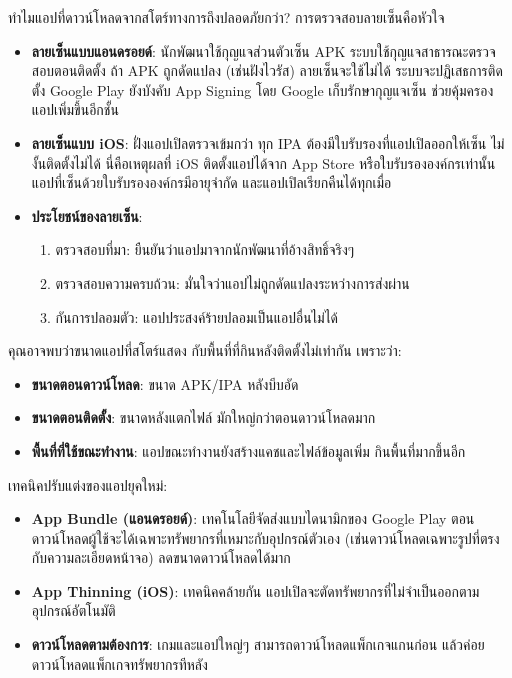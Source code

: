 
ทำไมแอปที่ดาวน์โหลดจากสโตร์ทางการถึงปลอดภัยกว่า? การตรวจสอบลายเซ็นคือหัวใจ

\begin{itemize}
  \item \textbf{ลายเซ็นแบบแอนดรอยด์}: นักพัฒนาใช้กุญแจส่วนตัวเซ็น APK ระบบใช้กุญแจสาธารณะตรวจสอบตอนติดตั้ง ถ้า APK ถูกดัดแปลง (เช่นฝังไวรัส) ลายเซ็นจะใช้ไม่ได้ ระบบจะปฏิเสธการติดตั้ง Google Play ยังบังคับ App Signing โดย Google เก็บรักษากุญแจเซ็น ช่วยคุ้มครองแอปเพิ่มขึ้นอีกชั้น
  \item \textbf{ลายเซ็นแบบ iOS}: ฝั่งแอปเปิลตรวจเข้มกว่า ทุก IPA ต้องมีใบรับรองที่แอปเปิลออกให้เซ็น ไม่งั้นติดตั้งไม่ได้ นี่คือเหตุผลที่ iOS ติดตั้งแอปได้จาก App Store หรือใบรับรององค์กรเท่านั้น แอปที่เซ็นด้วยใบรับรององค์กรมีอายุจำกัด และแอปเปิลเรียกคืนได้ทุกเมื่อ
  \item \textbf{ประโยชน์ของลายเซ็น}:
  \begin{enumerate}
    \item ตรวจสอบที่มา: ยืนยันว่าแอปมาจากนักพัฒนาที่อ้างสิทธิ์จริงๆ
    \item ตรวจสอบความครบถ้วน: มั่นใจว่าแอปไม่ถูกดัดแปลงระหว่างการส่งผ่าน
    \item กันการปลอมตัว: แอปประสงค์ร้ายปลอมเป็นแอปอื่นไม่ได้
  \end{enumerate}
\end{itemize}


คุณอาจพบว่าขนาดแอปที่สโตร์แสดง กับพื้นที่ที่กินหลังติดตั้งไม่เท่ากัน เพราะว่า:

\begin{itemize}
  \item \textbf{ขนาดตอนดาวน์โหลด}: ขนาด APK/IPA หลังบีบอัด
  \item \textbf{ขนาดตอนติดตั้ง}: ขนาดหลังแตกไฟล์ มักใหญ่กว่าตอนดาวน์โหลดมาก
  \item \textbf{พื้นที่ที่ใช้ขณะทำงาน}: แอปขณะทำงานยังสร้างแคชและไฟล์ข้อมูลเพิ่ม กินพื้นที่มากขึ้นอีก
\end{itemize}

เทคนิคปรับแต่งของแอปยุคใหม่:

\begin{itemize}
  \item \textbf{App Bundle (แอนดรอยด์)}: เทคโนโลยีจัดส่งแบบไดนามิกของ Google Play ตอนดาวน์โหลดผู้ใช้จะได้เฉพาะทรัพยากรที่เหมาะกับอุปกรณ์ตัวเอง (เช่นดาวน์โหลดเฉพาะรูปที่ตรงกับความละเอียดหน้าจอ) ลดขนาดดาวน์โหลดได้มาก
  \item \textbf{App Thinning (iOS)}: เทคนิคคล้ายกัน แอปเปิลจะตัดทรัพยากรที่ไม่จำเป็นออกตามอุปกรณ์อัตโนมัติ
  \item \textbf{ดาวน์โหลดตามต้องการ}: เกมและแอปใหญ่ๆ สามารถดาวน์โหลดแพ็กเกจแกนก่อน แล้วค่อยดาวน์โหลดแพ็กเกจทรัพยากรทีหลัง
\end{itemize}

